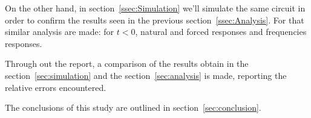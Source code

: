 \par On the other hand, in section~\ref{ssec:Simulation} we'll simulate the same circuit in order to confirm the results seen in the previous section~\ref{ssec:Analysis}. For that similar analysis are made: for $t<0$, natural and forced responses and frequencies responses.

\par Through out the report, a comparison of the results obtain in the section~\ref{sec:simulation} and the section~\ref{sec:analysis} is made, reporting the relative errors encountered. 

\par  The conclusions of this study are outlined in section~\ref{sec:conclusion}.
